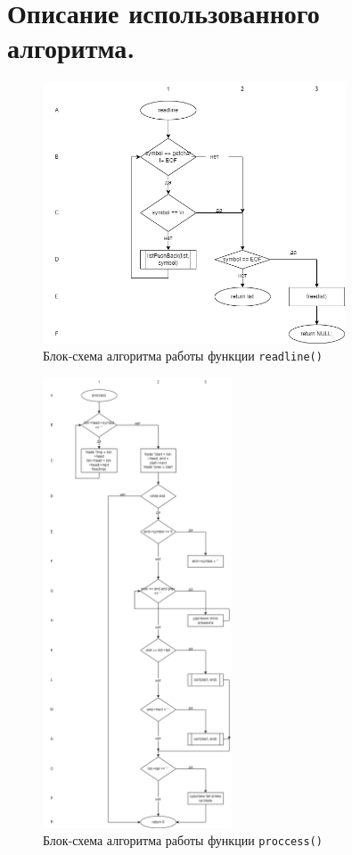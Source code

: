 \section{Описание использованного алгоритма.}

\begin{figure}[H]
  \centering
  \includegraphics[width=0.8\textwidth]{pics/6readline.png}
  \caption{Блок-схема алгоритма работы функции \texttt{readline()}}
\end{figure}

\newpage

\begin{figure}[H]
    \centering
    \includegraphics[width=0.5\textwidth]{pics/6proccess.png}
    \caption{Блок-схема алгоритма работы функции \texttt{proccess()}}
  \end{figure}



\newpage

